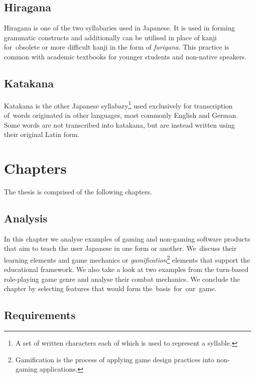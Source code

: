 \documentclass[thesis=B,english,hidelinks]{FITthesisXE}[2012/06/26]
\begin{document}
\begin{introduction}
\subsection{Hiragana}

Hiragana is one of the two syllabaries used in Japanese\autocite{literacy}. It is used in forming grammatic constructs and additionally can be utilised in place of kanji for~obsolete or more difficult kanji in the form of \emph{furigana}. This practice is common with academic textbooks for younger students and non-native speakers.

\subsection{Katakana}

Katakana is the other Japanese syllabary\footnote{A set of written characters each of which is used to represent a syllable\autocite{merriamsyllabary}.} used exclusively for transcription of~words originated in other languages, most commonly English and German\autocite{literacy}. Some words are not transcribed into katakana, but are instead written using their original Latin form.

\newpage

\section{Chapters}

The thesis is comprised of the following chapters.

\subsection{Analysis}

In this chapter we analyse examples of gaming and non-gaming software products that aim to teach the user Japanese in one form or another. We~discuss their learning elements and game mechanics or \emph{gamification}\footnote{Gamification is the process of applying game design practices into non-gaming applications.} elements that support the educational framework. We also take a look at two examples from the turn-based role-playing game genre and analyse their combat mechanics. We conclude the chapter by selecting features that would form the~basis~for~our~game.

\subsection{Requirements}


\end{introduction}
\end{document}
